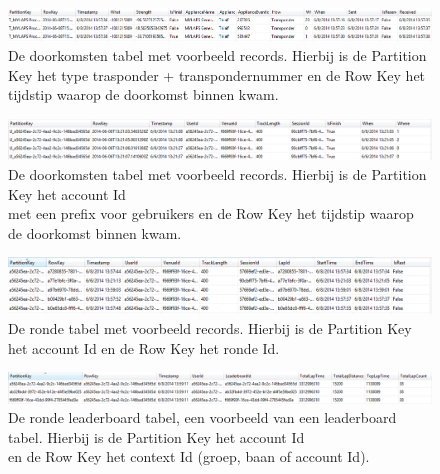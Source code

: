 \begin{figure}[h!]
  \begin{center}
  \includegraphics[width=\textwidth]{style/images/passingsStructure}    
  \end{center}
  \caption{De doorkomsten tabel met voorbeeld records. Hierbij is de Partition Key het type trasponder + transpondernummer en de Row Key het tijdstip waarop de doorkomst binnen kwam.}
  \label{fig:passingTableStructure}
\end{figure}

\begin{figure}[h!]
  \begin{center}
  \includegraphics[width=\textwidth]{style/images/userPassingsStructure}    
  \end{center}
  \caption{De doorkomsten tabel met voorbeeld records. Hierbij is de Partition Key het account Id \\met een prefix voor gebruikers en de Row Key het tijdstip waarop de doorkomst binnen kwam.}
  \label{fig:userPassingTableStructure}
\end{figure}

\begin{figure}[h!]
  \begin{center}
  \includegraphics[width=\textwidth]{style/images/aggregationLapsStructure}    
  \end{center}
  \caption{De ronde tabel met voorbeeld records. Hierbij is de Partition Key het account Id en de Row Key het ronde Id.}
  \label{fig:lapTableStructure}
\end{figure}

\begin{figure}[h!]
  \begin{center}
  \includegraphics[width=\textwidth]{style/images/lapLeaderboardStructure}    
  \end{center}
  \caption{De ronde leaderboard tabel, een voorbeeld van een leaderboard tabel. Hierbij is de Partition Key het account Id\\ en de Row Key het context Id (groep, baan of account Id).}
  \label{fig:lapLeaderboardTableStructure}
\end{figure}

\clearpage
